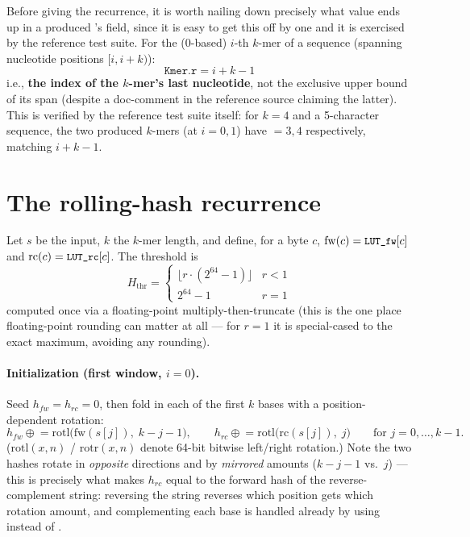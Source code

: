 Before giving the recurrence, it is worth nailing down precisely what value ends up in a produced
's  field, since it is easy to get this off by one and it is exercised by the
reference test suite. For the ($0$-based) $i$-th $k$-mer of a sequence (spanning nucleotide
positions $[i, i{+}k)$):
\[
  \texttt{Kmer.r} = i + k - 1
\]
i.e., \textbf{the index of the $k$-mer's last nucleotide}, not the exclusive upper bound of its
span (despite a doc-comment in the reference source claiming the latter). This is verified by the
reference test suite itself: for $k=4$ and a 5-character sequence, the two produced $k$-mers (at
$i=0,1$) have  $=3,4$ respectively, matching $i+k-1$.

\section{The rolling-hash recurrence}
\label{sec:fracminhash-hash}

Let $s$ be the input, $k$ the $k$-mer length, and define, for a byte $c$, $\mathrm{fw}(c) =
\text{\texttt{\small LUT\_fw}}[c]$ and $\mathrm{rc}(c) = \text{\texttt{\small LUT\_rc}}[c]$. The threshold is
\[
  H_{\mathrm{thr}} = \begin{cases} \lfloor r \cdot (2^{64}-1) \rfloor & r < 1 \\ 2^{64}-1 & r = 1
  \end{cases}
\]
computed once via a floating-point multiply-then-truncate (this is the one place floating-point
rounding can matter at all --- for $r=1$ it is special-cased to the exact maximum, avoiding any
rounding).

\paragraph{Initialization (first window, $i=0$).} Seed $h_{fw}=h_{rc}=0$, then fold in each of the
first $k$ bases with a position-dependent rotation:
\[
  h_{fw} \mathrel{\oplus}= \mathrm{rotl}\bigl(\mathrm{fw}(s[j]),\; k-j-1\bigr), \qquad
  h_{rc} \mathrel{\oplus}= \mathrm{rotl}\bigl(\mathrm{rc}(s[j]),\; j\bigr)
  \qquad\text{for } j = 0,\dots,k-1.
\]
(\(\mathrm{rotl}(x,n)\) / \(\mathrm{rotr}(x,n)\) denote 64-bit bitwise left/right rotation.) Note
the two hashes rotate in \emph{opposite} directions and by \emph{mirrored} amounts ($k{-}j{-}1$
vs.\ $j$) --- this is precisely what makes $h_{rc}$ equal to the forward hash of the
reverse-complement string: reversing the string reverses which position gets which rotation
amount, and complementing each base is handled already by using  instead of
.


